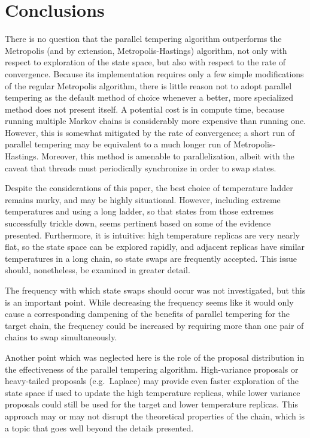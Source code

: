 \chapter*{Conclusions}
There is no question that the parallel tempering algorithm outperforms the
Metropolis (and by extension, Metropolis-Hastings) algorithm, not only with
respect to exploration of the state space, but also with respect to the rate
of convergence.
Because its implementation requires only a few simple modifications of the
regular Metropolis algorithm, there is little reason not to adopt parallel
tempering as the default method of choice whenever a better, more specialized
method does not present itself.
A potential cost is in compute time, because running multiple Markov chains is
considerably more expensive than running one.
However, this is somewhat mitigated by the rate of convergence; a short run of
parallel tempering may be equivalent to a much longer run of
Metropolis-Hastings.
Moreover, this method is amenable to parallelization, albeit with the caveat
that threads must periodically synchronize in order to swap states.

Despite the considerations of this paper, the best choice of temperature ladder
remains murky, and may be highly situational. 
However, including extreme temperatures and using a long ladder, so that states
from those extremes successfully trickle down, seems pertinent based on some
of the evidence presented.
Furthermore, it is intuitive: high temperature replicas are very nearly flat,
so the state space can be explored rapidly, and adjacent replicas have similar
temperatures in a long chain, so state swaps are frequently accepted.
This issue should, nonetheless, be examined in greater detail.

The frequency with which state swaps should occur was not investigated,
but this is an important point. 
While decreasing the frequency seems like it would only cause a corresponding
dampening of the benefits of parallel tempering for the target chain,
the frequency could be increased by requiring more than one pair of chains
to swap simultaneously.

Another point which was neglected here is the role of the proposal distribution
in the effectiveness of the parallel tempering algorithm.
High-variance proposals or heavy-tailed proposals (e.g.\ Laplace) may
provide even faster exploration of the state space if used to update the high
temperature replicas, while lower variance proposals could still be used for
the target and lower temperature replicas.
This approach may or may not disrupt the theoretical properties of the chain,
which is a topic that goes well beyond the details presented.

